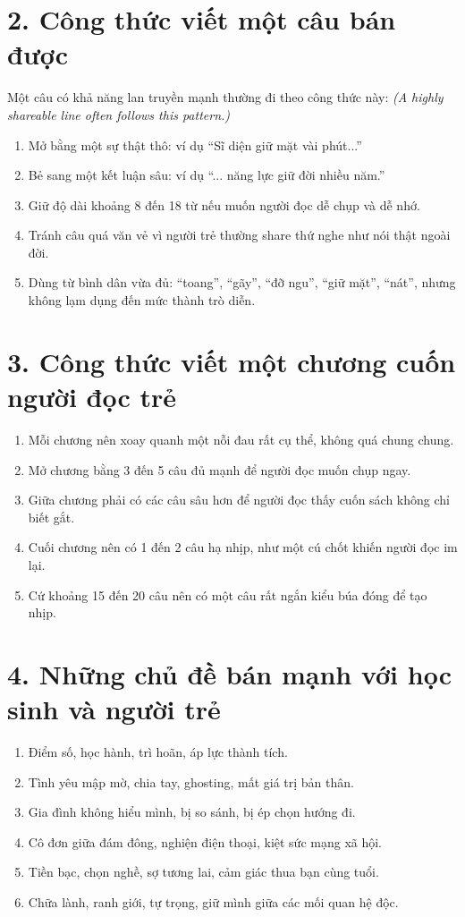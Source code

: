\section{2. Công thức viết một câu bán được}
\begin{tuhocnhanh}
Một câu có khả năng lan truyền mạnh thường đi theo công thức này:
\textit{(A highly shareable line often follows this pattern.)}
\end{tuhocnhanh}

\begin{enumerate}[leftmargin=*]
\item Mở bằng một sự thật thô: ví dụ ``Sĩ diện giữ mặt vài phút...''
\item Bẻ sang một kết luận sâu: ví dụ ``... năng lực giữ đời nhiều năm.''
\item Giữ độ dài khoảng 8 đến 18 từ nếu muốn người đọc dễ chụp và dễ nhớ.
\item Tránh câu quá văn vẻ vì người trẻ thường share thứ nghe như nói thật ngoài đời.
\item Dùng từ bình dân vừa đủ: ``toang'', ``gãy'', ``đỡ ngu'', ``giữ mặt'', ``nát'', nhưng không lạm dụng đến mức thành trò diễn.
\end{enumerate}

\section{3. Công thức viết một chương cuốn người đọc trẻ}
\begin{enumerate}[leftmargin=*]
\item Mỗi chương nên xoay quanh một nỗi đau rất cụ thể, không quá chung chung.
\item Mở chương bằng 3 đến 5 câu đủ mạnh để người đọc muốn chụp ngay.
\item Giữa chương phải có các câu sâu hơn để người đọc thấy cuốn sách không chỉ biết gắt.
\item Cuối chương nên có 1 đến 2 câu hạ nhịp, như một cú chốt khiến người đọc im lại.
\item Cứ khoảng 15 đến 20 câu nên có một câu rất ngắn kiểu búa đóng để tạo nhịp.
\end{enumerate}

\section{4. Những chủ đề bán mạnh với học sinh và người trẻ}
\begin{enumerate}[leftmargin=*]
\item Điểm số, học hành, trì hoãn, áp lực thành tích.
\item Tình yêu mập mờ, chia tay, ghosting, mất giá trị bản thân.
\item Gia đình không hiểu mình, bị so sánh, bị ép chọn hướng đi.
\item Cô đơn giữa đám đông, nghiện điện thoại, kiệt sức mạng xã hội.
\item Tiền bạc, chọn nghề, sợ tương lai, cảm giác thua bạn cùng tuổi.
\item Chữa lành, ranh giới, tự trọng, giữ mình giữa các mối quan hệ độc.
\end{enumerate}

